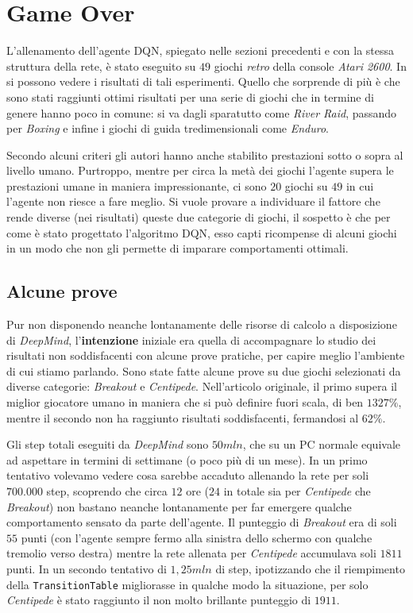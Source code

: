 \documentclass[twoside,twocolumn,10pt]{extarticle}
\theoremstyle{definition}
\begin{document}
\section{Game Over}\label{}
	L'allenamento dell'agente DQN, spiegato nelle sezioni precedenti e con la stessa struttura della rete, è stato eseguito su $49$ giochi \textit{retro} della console \textit{Atari 2600}. In \cite{bib:dqn} si possono vedere i risultati di tali esperimenti. Quello che sorprende di più è che sono stati raggiunti ottimi risultati per una serie di giochi che in termine di genere hanno poco in comune: si va dagli sparatutto come \textit{River Raid}, passando per \textit{Boxing} e infine i giochi di guida tredimensionali come \textit{Enduro}.
	
	Secondo alcuni criteri gli autori hanno anche stabilito prestazioni sotto o sopra al livello umano. Purtroppo, mentre per circa la metà dei giochi l'agente supera le prestazioni umane in maniera impressionante, ci sono $20$ giochi su $49$ in cui l'agente non riesce a fare meglio. Si vuole provare a individuare il fattore che rende diverse (nei risultati) queste due categorie di giochi, il sospetto è che per come è stato progettato l'algoritmo DQN, esso capti ricompense di alcuni giochi in un modo che non gli permette di imparare comportamenti ottimali.
	
	\subsection{Alcune prove}
		Pur non disponendo neanche lontanamente delle risorse di calcolo a disposizione di \textit{DeepMind}, l'\textbf{intenzione} iniziale era quella di accompagnare lo studio dei risultati non soddisfacenti con alcune prove pratiche, per capire meglio l'ambiente di cui stiamo parlando. Sono state fatte alcune prove su due giochi selezionati da diverse categorie: \textit{Breakout} e \textit{Centipede}. Nell'articolo originale, il primo supera il miglior giocatore umano in maniera che si può definire fuori scala, di ben $1327\%$, mentre il secondo non ha raggiunto risultati soddisfacenti, fermandosi al $62\%$.
		
		Gli step totali eseguiti da \textit{DeepMind} sono $50mln$, che su un PC normale equivale ad aspettare in termini di settimane (o poco più di un mese). In un primo tentativo volevamo vedere cosa sarebbe accaduto allenando la rete per soli $700.000$ step, scoprendo che circa $12$ ore ($24$ in totale sia per \textit{Centipede} che \textit{Breakout}) non bastano neanche lontanamente per far emergere qualche comportamento sensato da parte dell'agente. Il punteggio di \textit{Breakout} era di soli $55$ punti (con l'agente sempre fermo alla sinistra dello schermo con qualche tremolio verso destra) mentre la rete allenata per \textit{Centipede} accumulava soli $1811$ punti. In un secondo tentativo di $1,25mln$ di step, ipotizzando che il riempimento della \texttt{TransitionTable} migliorasse in qualche modo la situazione, per solo \textit{Centipede} è stato raggiunto il non molto brillante punteggio di $1911$.
		
\end{document}
